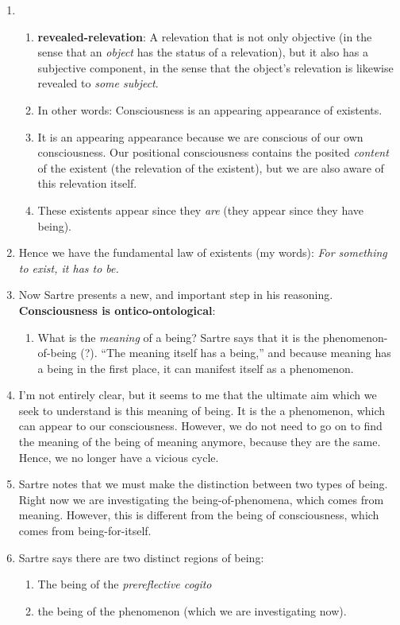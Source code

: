 \begin{enumerate}
  \item {}
  \begin{enumerate}
    \item \textbf{revealed-relevation}: A relevation that is not only objective (in the sense that an \emph{object} has the status of a relevation), but it also has a subjective component, in the sense that the object's relevation is likewise revealed to \emph{some subject}.
    \item In other words: Consciousness is an appearing appearance of existents.
    \item It is an appearing appearance because we are conscious of our own consciousness. Our positional consciousness contains the posited \emph{content} of the existent (the relevation of the existent), but we are also aware of this relevation itself.
    \item These existents appear since they \emph{are} (they appear since they have being).
  \end{enumerate}
  \item Hence we have the fundamental law of existents (my words): \emph{For something to exist, it has to be.}
  \item Now Sartre presents a new, and important step in his reasoning. \textbf{Consciousness is ontico-ontological}: 
  \begin{enumerate}
    \item What is the \emph{meaning} of a being? Sartre says that it is the phenomenon-of-being (?). \enquote{The meaning itself has a being,} and because meaning has a being in the first place, it can manifest itself as a phenomenon.
  \end{enumerate}
  \item I'm not entirely clear, but it seems to me that the ultimate aim which we seek to understand is this meaning of being. It is the a phenomenon, which can appear to our consciousness. However, we do not need to go on to find the meaning of the being of meaning anymore, because they are the same. Hence, we no longer have a vicious cycle.
  \item Sartre notes that we must make the distinction between two types of being. Right now we are investigating the being-of-phenomena, which comes from meaning. However, this is different from the being of consciousness, which comes from being-for-itself.
  \item Sartre says there are two distinct regions of being:
  \begin{enumerate}
    \item The being of the \emph{prereflective cogito}
    \item the being of the phenomenon (which we are investigating now).
  \end{enumerate}
\end{enumerate}
